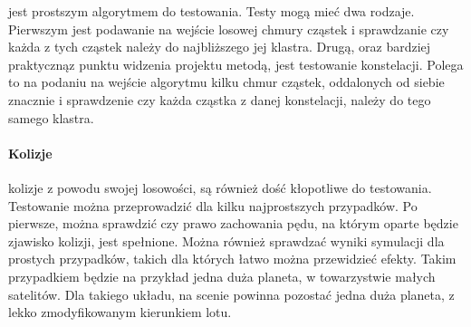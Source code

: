 jest prostszym algorytmem do testowania. Testy mogą mieć dwa rodzaje. Pierwszym jest podawanie na wejście losowej chmury cząstek i sprawdzanie czy każda z tych cząstek należy do najbliższego jej klastra. Drugą, oraz bardziej praktycznąz punktu widzenia projektu metodą, jest testowanie konstelacji. Polega to na podaniu na wejście algorytmu kilku chmur cząstek, oddalonych od siebie znacznie i sprawdzenie czy każda cząstka z danej konstelacji, należy do tego samego klastra.

\paragraph{Kolizje}

kolizje z powodu swojej losowości, są również dość kłopotliwe do testowania. Testowanie można przeprowadzić dla kilku najprostszych przypadków. Po pierwsze, można sprawdzić czy prawo zachowania pędu, na którym oparte będzie zjawisko kolizji, jest spełnione. Można również sprawdzać wyniki symulacji dla prostych przypadków, takich dla których łatwo można przewidzieć efekty. Takim przypadkiem będzie na przykład jedna duża planeta, w towarzystwie małych satelitów. Dla takiego układu, na scenie powinna pozostać jedna duża planeta, z lekko zmodyfikowanym kierunkiem lotu.

